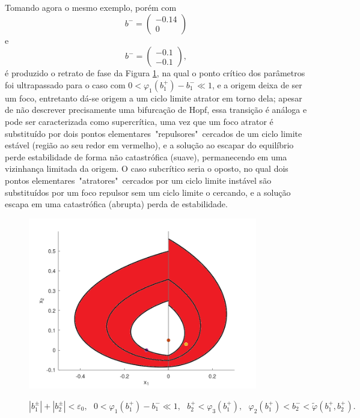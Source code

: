 Tomando agora o mesmo exemplo, porém com
\[
b^-=\begin{pmatrix}
-0.14\\
0
\end{pmatrix}
\]
e
\[
b^-=\begin{pmatrix}
-0.1\\
-0.1
\end{pmatrix},
\]
é produzido o retrato de fase da Figura \ref{hdist}, na qual o ponto crítico dos parâmetros foi ultrapassado para o caso com $0<\varphi_{1}\left(b_{1}^{+}\right)-b_{1}^{-}\ll 1$, e a origem deixa de ser um foco, entretanto dá-se origem a um ciclo limite atrator em torno dela; apesar de não descrever precisamente uma bifurcação de Hopf, essa transição é análoga e pode ser caracterizada como supercrítica, uma vez que um foco atrator é substituído por dois pontos elementares~"repulsores"~cercados de um ciclo limite estável (região ao seu redor em vermelho), e a solução ao escapar do equilíbrio perde estabilidade de forma não catastrófica (suave), permanecendo em uma vizinhança limitada da origem. O caso subcrítico seria o oposto, no qual dois pontos elementares~"atratores"~cercados por um ciclo limite instável são substituídos por um foco repulsor sem um ciclo limite o cercando, e a solução escapa em uma catastrófica (abrupta) perda de estabilidade.
\begin{figure}[H]
\centering
\includegraphics[width=10cm]{disturb_mid}\\
\caption{\label{hdist}$\left|b_{1}^{\pm}\right|+\left|b_{2}^{\pm}\right|<\varepsilon_{0},\text{ }0<\varphi_{1}\left(b_{1}^{+}\right)-b_{1}^{-} \ll 1,\text{ }b_{2}^{+}<\varphi_{3}\left(b_{1}^{+}\right),\text{ }  \varphi_{2}\left(b_{1}^{+}\right)<b_{2}^{-}<\tilde{\varphi}\left(b_{1}^{+}, b_{2}^{+}\right).$}
\end{figure}

